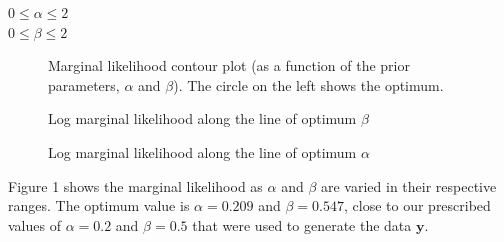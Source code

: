 \documentclass{article}
\begin{document}
\begin{center}
	$0 \leq \alpha \leq 2$ \\
	$0 \leq \beta \leq 2$
\end{center}

\begin{figure}[H]
	\centering
	\caption{Marginal likelihood contour plot (as a function of the prior parameters, $\alpha$ and $\beta$). The circle on the left shows the optimum.}
	\label{fig:fig1}
	
	\caption{Log marginal likelihood along the line of optimum $\beta$}
	\label{fig:fig1}
	
	\caption{Log marginal likelihood along the line of optimum $\alpha$}
	\label{fig:fig1}
\end{figure}
Figure 1 shows the marginal likelihood as $\alpha$ and $\beta$ are varied in their respective ranges. The optimum value is $\alpha = 0.209$ and $\beta = 0.547$, close to our prescribed values of $\alpha = 0.2$ and $\beta = 0.5$ that were used to generate the data $\boldsymbol{y}$.
\end{document}
